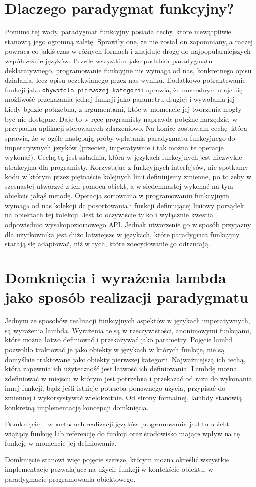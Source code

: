 \documentclass[a4paper,10pt]{report}
\begin{document}
\section{Dlaczego paradygmat funkcyjny?}
Pomimo tej wady, paradygmat funkcyjny posiada cechy, które niewątpliwie stanowią jego ogromną zaletę. Sprawiły one, że nie został on zapomniany, a raczej powraca co jakiś czas w różnych formach i znajduje drogę do najpopularniejszych współcześnie języków. Przede wszystkim jako podzbiór paradygmatu deklaratywnego, programowanie funkcyjne nie wymaga od nas, konkretnego opisu działania, lecz opisu oczekwianego przez nas wyniku. Dodatkowo potraktowanie funkcji jako \verb|obywatela pierwszej kategorii| sprawia, że normalnym staje się możliwość przekazania jednej funkcji jako parametru drugiej i wywołania jej kiedy będzie potrzebna, z argumentami, któe w momencie jej tworzenia mogły być nie dostępne. Daje to w ręce programisty naprawde potężne narzędzie, w przypadku aplikacji sterowanych zdarzeniowo. Na koniec zostawiam cechę, która sprawia, że w ogóle następują próby wplatania paradygmatu funkcyjnego do imperatywnych języków (przecież, imperatywnie i tak można te operacje wykonać). Cechą tą jest składnia, która w językach funkcyjnych jest niezwykle atrakcyjna dla programisty. Korzystając z funkcyjnych interfejsów, nie spotkamy kodu w którym przez piętnaście kolejnych linii definiujemy zmienne, po to żeby w szesnastej utworzyć z ich pomocą obiekt, a w siedemnastej wykonać na tym obiekcie jakąś metodę. Operacja sortowania w programowaniu funkcyjnym wymaga od nas kolekcji do posortowania i funkcji definiującej liniowy porządek na obiektach tej kolekcji. Jest to oczywiście tylko i wyłącznie kwestia odpowiednio wysokopoziomowego API. Jednak utworzenie go w sposób przyjazny dla użytkownika jest dużo łatwiejsze w językach, które paradygmat funkcyjny starają się adaptować, niż w tych, które zdecydowanie go odrzucają.
\section{Domknięcia i wyrażenia lambda jako sposób realizacji paradygmatu}
Jednym ze sposobów realizacji funkcyjnych aspektów w językach imperatywnych, są wyrażenia lambda. Wyrażenia te są w rzeczywistości, anonimowymi funkcjami, które można łatwo definiować i przekazywać jako parametry. Pojęcie lambd pozwoliło traktować je jako obiekty w językach w których funkcje, nie są domyślnie traktowane jako obiekty pierwszej kategorii. Najważniejszą ich cechą, która zapewnia ich użyteczność jest łatwość ich definiowania. Lambdę można zdefiniować w miejscu w którym jest potrzebna i przekazać od razu do wykonania innej funkcji, bądź jeśli istnieje potrzeba ponownego użycia, przypisać do zmiennej i wykorzystywać wielokrotnie. Od strony formalnej, lambdy stanowią konkretną implementację koncepcji domknięcia.
\begin{theo}
Domknięcie – w metodach realizacji języków programowania jest to obiekt wiążący funkcję lub referencję do funkcji oraz środowisko mające wpływ na tę funkcję w momencie jej definiowania.
\end{theo}
Domknięcie stanowi więc pojęcie szersze, którym można określić wszystkie implementacje pozwalające na użycie funkcji w kontekście obiektu, w paradygmacie programowania obiektowego.
\end{document}
